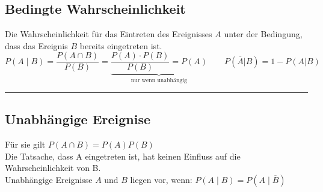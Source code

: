 \subsection{Bedingte Wahrscheinlichkeit }
Die Wahrscheinlichkeit für das Eintreten des Ereignisses $A$ unter der
Bedingung, dass das Ereignis $B$ bereits eingetreten ist.
\[\boxed{P(A\mid B)= \dfrac{P(A\cap B)}{P(B)}}=\underbrace{\frac{P(A)\cdot
  P(B)}{P(B)}=P(A)}_{\text{nur wenn unabhängig}} \qquad P(\overline{A}|B) = 1 -
  P(A|B)\]
  
\hrule

\subsection{Unabhängige Ereignise }
		Für sie gilt \hspace*{5mm} $\boxed{P(A\cap B)=P(A)P(B)}$\\
    	Die Tatsache, dass A eingetreten ist, hat keinen Einfluss auf die 
		Wahrscheinlichkeit von B.\\
		Unabhängige Ereignisse $A$ und $B$ liegen vor, wenn: 
		\hspace*{5mm} $P(A\mid B)=P(A\mid \overline{B})$ \\		

